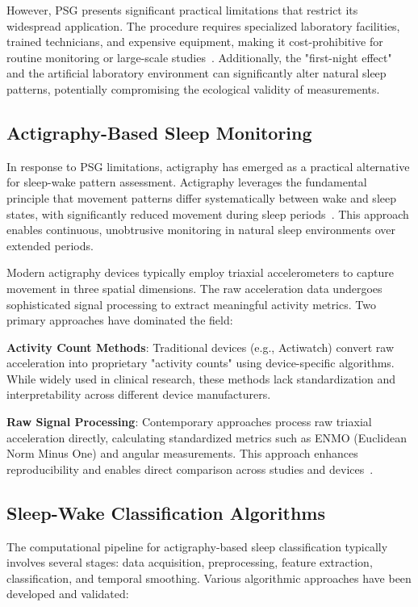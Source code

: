 \documentclass[conference]{IEEEtran}
\begin{document}
However, PSG presents significant practical limitations that restrict its widespread application. The procedure requires specialized laboratory facilities, trained technicians, and expensive equipment, making it cost-prohibitive for routine monitoring or large-scale studies~\cite{PMC8141649, PMC9727457}. Additionally, the "first-night effect" and the artificial laboratory environment can significantly alter natural sleep patterns, potentially compromising the ecological validity of measurements.

\subsection{Actigraphy-Based Sleep Monitoring}

In response to PSG limitations, actigraphy has emerged as a practical alternative for sleep-wake pattern assessment. Actigraphy leverages the fundamental principle that movement patterns differ systematically between wake and sleep states, with significantly reduced movement during sleep periods~\cite{vanHees2015, PMC6801055}. This approach enables continuous, unobtrusive monitoring in natural sleep environments over extended periods.

Modern actigraphy devices typically employ triaxial accelerometers to capture movement in three spatial dimensions. The raw acceleration data undergoes sophisticated signal processing to extract meaningful activity metrics. Two primary approaches have dominated the field:

\textbf{Activity Count Methods}: Traditional devices (e.g., Actiwatch) convert raw acceleration into proprietary "activity counts" using device-specific algorithms. While widely used in clinical research, these methods lack standardization and interpretability across different device manufacturers.

\textbf{Raw Signal Processing}: Contemporary approaches process raw triaxial acceleration directly, calculating standardized metrics such as ENMO (Euclidean Norm Minus One) and angular measurements. This approach enhances reproducibility and enables direct comparison across studies and devices~\cite{vanHees2015}.

\subsection{Sleep-Wake Classification Algorithms}

The computational pipeline for actigraphy-based sleep classification typically involves several stages: data acquisition, preprocessing, feature extraction, classification, and temporal smoothing. Various algorithmic approaches have been developed and validated:
\end{document}
